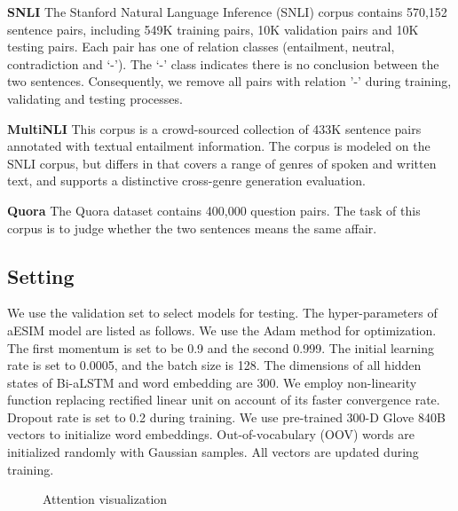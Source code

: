 \documentclass[10pt,sigconf]{acmart}
\begin{document}
\textbf{SNLI} The Stanford Natural Language Inference (SNLI) corpus contains 570,152 sentence pairs, including 549K training pairs, 10K validation pairs and 10K testing pairs. Each pair has one of relation classes (entailment, neutral, contradiction and ‘-’). The ‘-’ class indicates there is no conclusion between the two sentences. Consequently, we remove all pairs with relation '-' during training, validating and testing processes.

\textbf{MultiNLI} This corpus is a crowd-sourced collection of 433K sentence pairs annotated with textual entailment information. The corpus is modeled on the SNLI corpus, but differs in that covers a range of genres of spoken and written text, and supports a distinctive cross-genre generation evaluation.

\textbf{Quora} The Quora dataset contains 400,000 question pairs. The task of this corpus is to judge whether the two sentences means the same affair.

\subsection{Setting}

We use the validation set to select models for testing. The hyper-parameters of aESIM model are listed as follows. We use the Adam method \cite{kingma2014adam} for optimization. The first momentum is set to be 0.9 and the second 0.999. The initial learning rate is set to 0.0005, and the batch size is 128. The dimensions of all hidden states of Bi-aLSTM and word embedding are 300. We employ non-linearity function  \cite{klambauer2017self} replacing rectified linear unit  on account of its faster convergence rate. Dropout rate is set to 0.2 during training. We use pre-trained 300-D Glove 840B vectors \cite{pennington2014glove} to initialize word embeddings. Out-of-vocabulary (OOV) words are initialized randomly with Gaussian samples. All vectors are updated during training.

\begin{figure*}[h]
    \centering
    \caption{Attention visualization}
    \label{fig:attention}
\end{figure*}
\end{document}
